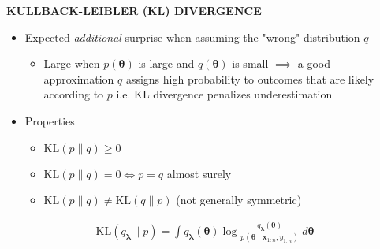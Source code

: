 \begin{whitebox}{\textbf{KULLBACK-LEIBLER (KL) DIVERGENCE}}
    \begin{itemize}
        \item Expected \textit{additional} surprise when assuming the "wrong" distribution $q$
        \begin{itemize}
            \item Large when $p(\bm{\theta})$ is large and $q(\bm{\theta})$ is small $\implies$ a good approximation $q$ assigns high probability to outcomes that are likely according to $p$ i.e. KL divergence penalizes underestimation
        \end{itemize}
        \item Properties
        \begin{itemize}
            \item $\mathrm{KL}(p\|q)\geq 0$
            \item $\mathrm{KL}(p\|q)=0\Longleftrightarrow p=q$ almost surely
            \item $\mathrm{KL}(p\|q)\neq \mathrm{KL}(q\| p)$ (not generally symmetric)
        \end{itemize}
    \end{itemize}
    \begin{align*}
        \mathrm{KL}(q_{\bm{\lambda}}\|p)=\int q_{\bm{\lambda}}(\bm{\theta})\log\frac{q_{\bm{\lambda}}(\bm{\theta})}{p(\bm{\theta}\mid \bm{x}_{1:n},y_{1:n})}\ d\bm{\theta}
    \end{align*}
\end{whitebox}

